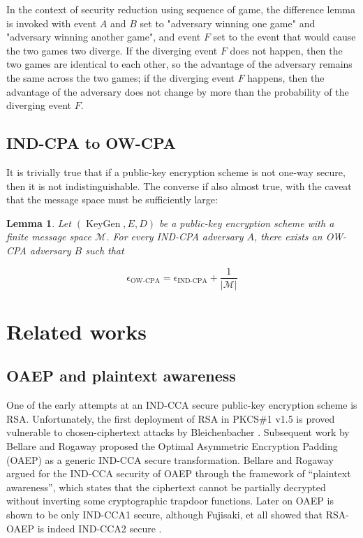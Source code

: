 \documentclass{article}
\newcommand{\norm}[1]{\vert {#1} \vert}
\newtheorem{lemma}{Lemma}
\begin{document}
In the context of security reduction using sequence of game, the difference lemma is invoked with event $A$ and $B$ set to "adversary winning one game" and "adversary winning another game", and event $F$ set to the event that would cause the two games two diverge. If the diverging event $F$ does not happen, then the two games are identical to each other, so the advantage of the adversary remains the same across the two games; if the diverging event $F$ happens, then the advantage of the adversary does not change by more than the probability of the diverging event $F$.

\subsection{IND-CPA to OW-CPA}\label{ind-cpa-to-ow-cpa}
It is trivially true that if a public-key encryption scheme is not one-way secure, then it is not indistinguishable. The converse if also almost true, with the caveat that the message space must be sufficiently large: 

\begin{lemma}
    Let $(\operatorname{KeyGen}, E, D)$ be a public-key encryption scheme with a finite message space $\mathcal{M}$. For every IND-CPA adversary $A$, there exists an OW-CPA adversary $B$ such that

    \begin{equation*}
        \epsilon_\text{OW-CPA} = \epsilon_\text{IND-CPA} + \frac{1}{\norm{\mathcal{M}}}
    \end{equation*}
\end{lemma}

\section{Related works}
\subsection{OAEP and plaintext awareness}
    One of the early attempts at an IND-CCA secure public-key encryption scheme is RSA. Unfortunately, the first deployment of RSA in PKCS\#1 v1.5 \cite{kaliski1998rfc2313} is proved vulnerable to chosen-ciphertext attacks by Bleichenbacher \cite{bleichenbacher1998chosen}. Subsequent work by Bellare and Rogaway \cite{bellare1995optimal} proposed the Optimal Asymmetric Encryption Padding (OAEP) as a generic IND-CCA secure transformation. Bellare and Rogaway argued for the IND-CCA security of OAEP through the framework of ``plaintext awareness'', which states that the ciphertext cannot be partially decrypted without inverting some cryptographic trapdoor functions. Later on OAEP is shown to be only IND-CCA1 secure, although Fujisaki, et all showed that RSA-OAEP is indeed IND-CCA2 secure \cite{fujisaki2001rsa}.
\end{document}
